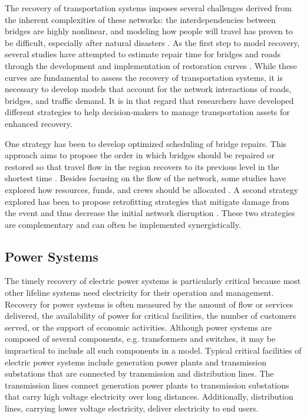 The recovery of transportation systems imposes several challenges derived from the inherent complexities of these networks: the interdependencies between bridges are highly nonlinear, and modeling how people will travel has proven to be difficult, especially after natural disasters \citep{chang2010transportation}. As the first step to model recovery, several studies have attempted to estimate repair time for bridges and roads through the development and implementation of restoration curves \citep{HAZUS-MH2015, padgett2007bridge}. While these curves are fundamental to assess the recovery of transportation systems, it is necessary to develop models that account for the network interactions of roads, bridges, and traffic demand. It is in that regard that researchers have developed different strategies to help decision-makers to manage transportation assets for enhanced recovery.

One strategy has been to develop optimized scheduling of bridge repairs. This approach aims to propose the order in which bridges should be repaired or restored so that travel flow in the region recovers to its previous level in the shortest time \citep{vugrin2014optimal}. Besides focusing on the flow of the network, some studies have explored how resources, funds, and crews should be allocated \citep{karlaftis2007fund}. A second strategy explored has been to propose retrofitting strategies that mitigate damage from the event and thus decrease the initial network disruption \citep{zhang2016resilience}. These two strategies are complementary and can often be implemented synergistically.\ 

\subsection{Power Systems}
The timely recovery of electric power systems is particularly critical because most other lifeline systems need electricity for their operation and management. Recovery for power systems is often measured by the amount of flow or services delivered, the availability of power for critical facilities, the number of customers served, or the support of economic activities. Although power systems are composed of several components, e.g. transformers and switches, it may be impractical to include all such components in a model. Typical critical facilities of electric power systems include generation power plants and transmission substations that are connected by transmission and distribution lines. The transmission lines connect generation power plants to transmission substations that carry high voltage electricity over long distances. Additionally, distribution lines, carrying lower voltage electricity, deliver electricity to end users. \

